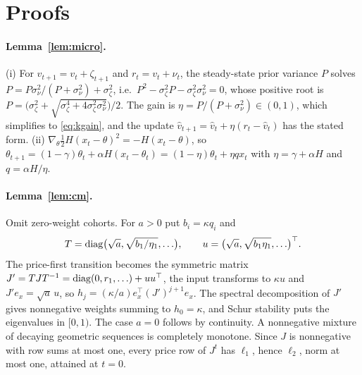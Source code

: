 \appendix
\section{Proofs}\label{app:proofs}

\paragraph{Lemma~\ref{lem:micro}.} (i) For $v_{t+1}=v_t+\zeta_{t+1}$ and $r_t=v_t+\nu_t$, the steady-state prior variance $P$ solves $P=P\sigma_\nu^2/(P+\sigma_\nu^2)+\sigma_\zeta^2$, i.e.\ $P^2-\sigma_\zeta^2P-\sigma_\zeta^2\sigma_\nu^2=0$, whose positive root is $P=\bigl(\sigma_\zeta^2+\sqrt{\sigma_\zeta^4+4\sigma_\zeta^2\sigma_\nu^2}\bigr)/2$. The gain is $\eta=P/(P+\sigma_\nu^2)\in(0,1)$, which simplifies to \eqref{eq:kgain}, and the update $\hat v_{t+1}=\hat v_t+\eta(r_t-\hat v_t)$ has the stated form. (ii) $\nabla_\theta\tfrac12H(x_t-\theta)^2=-H(x_t-\theta)$, so $\theta_{t+1}=(1-\gamma)\theta_t+\alpha H(x_t-\theta_t)=(1-\eta)\theta_t+\eta qx_t$ with $\eta=\gamma+\alpha H$ and $q=\alpha H/\eta$.

\paragraph{Lemma~\ref{lem:cm}.} Omit zero-weight cohorts. For $a>0$ put $b_i=\kappa q_i$ and
\[
T={\rm diag}\bigl(\sqrt a,\sqrt{b_1/\eta_1},\ldots\bigr),\qquad u=\bigl(\sqrt a,\sqrt{b_1\eta_1},\ldots\bigr)^\top .
\]
The price-first transition becomes the symmetric matrix $J'=TJT^{-1}={\rm diag}(0,r_1,\ldots)+uu^\top$, the input transforms to $\kappa u$ and $J'e_x=\sqrt a\,u$, so $h_j=(\kappa/a)e_x^\top(J')^{j+1}e_x$. The spectral decomposition of $J'$ gives nonnegative weights summing to $h_0=\kappa$, and Schur stability puts the eigenvalues in $[0,1)$. The case $a=0$ follows by continuity. A nonnegative mixture of decaying geometric sequences is completely monotone. Since $J$ is nonnegative with row sums at most one, every price row of $J^t$ has $\ell_1$, hence $\ell_2$, norm at most one, attained at $t=0$.

